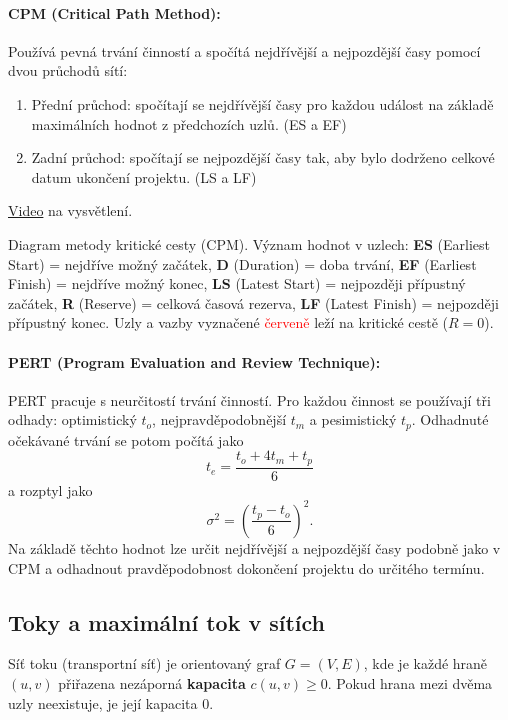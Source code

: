 \paragraph*{CPM (Critical Path Method):}
Používá pevná trvání činností a spočítá nejdřívější a nejpozdější časy pomocí dvou průchodů sítí:
\begin{enumerate}
    \item Přední průchod: spočítají se nejdřívější časy pro každou událost na základě maximálních hodnot z předchozích uzlů. (ES a EF)
    \item Zadní průchod: spočítají se nejpozdější časy tak, aby bylo dodrženo celkové datum ukončení projektu. (LS a LF)
\end{enumerate}

\href{https://www.youtube.com/watch?v=4oDLMs11Exs}{Video} na vysvětlení.



Diagram metody kritické cesty (CPM). Význam hodnot v uzlech: 
    \textbf{ES} (Earliest Start) = nejdříve možný začátek, 
    \textbf{D} (Duration) = doba trvání, 
    \textbf{EF} (Earliest Finish) = nejdříve možný konec, 
    \textbf{LS} (Latest Start) = nejpozději přípustný začátek, 
    \textbf{R} (Reserve) = celková časová rezerva, 
    \textbf{LF} (Latest Finish) = nejpozději přípustný konec. 
    Uzly a vazby vyznačené \textcolor{red}{červeně} leží na kritické cestě ($R = 0$).

\paragraph*{PERT (Program Evaluation and Review Technique):}
PERT pracuje s neurčitostí trvání činností. Pro každou činnost se používají tři odhady: optimistický $t_o$, nejpravděpodobnější $t_m$ a pesimistický $t_p$.
Odhadnuté očekávané trvání se potom počítá jako
\[
    t_e = \frac{t_o + 4t_m + t_p}{6}
\]
a rozptyl jako
\[
    \sigma^2 = \left(\frac{t_p - t_o}{6}\right)^2.
\]
Na základě těchto hodnot lze určit nejdřívější a nejpozdější časy podobně jako v CPM a odhadnout pravděpodobnost dokončení projektu do určitého termínu.

\subsection{Toky a maximální tok v sítích}
Síť toku (transportní síť) je orientovaný graf $G = (V, E)$, kde je každé hraně $(u, v)$ přiřazena nezáporná \textbf{kapacita} $c(u, v) \geq 0$. Pokud hrana mezi dvěma uzly neexistuje, je její kapacita $0$.

